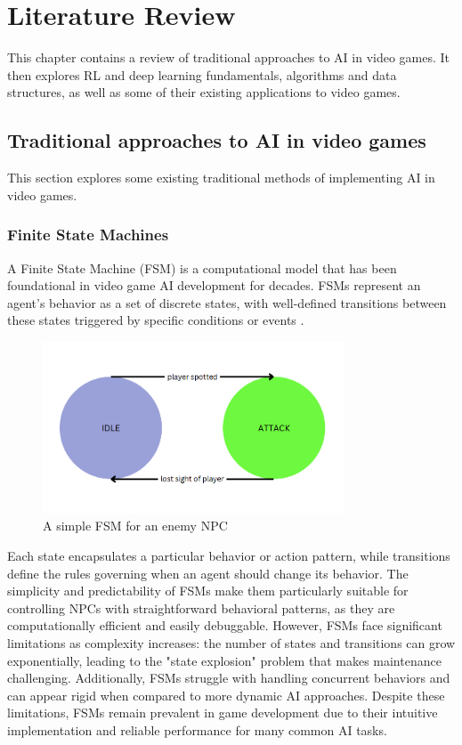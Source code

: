 \chapter{Literature Review}

This chapter contains a review of traditional approaches to AI in video games.
It then explores RL and deep learning fundamentals, algorithms and data structures, as well as some of their existing applications to video games.

\section{Traditional approaches to AI in video games}

This section explores some existing traditional methods of implementing AI in video games.

\subsection{Finite State Machines}

A Finite State Machine (FSM) is a computational model that has been foundational in video game AI development for decades. 
FSMs represent an agent's behavior as a set of discrete states, with well-defined transitions between these states triggered by specific conditions or events \cite{spiceworks_fsm}. 

\begin{figure}[H]
    \centering
    \includegraphics[width=0.8\textwidth]{figures/fsm_example.png}
    \caption{A simple FSM for an enemy NPC}
    \label{fig:fsm}
\end{figure}

Each state encapsulates a particular behavior or action pattern, while transitions define the rules governing when an agent should change its behavior. 
The simplicity and predictability of FSMs make them particularly suitable for controlling NPCs with straightforward behavioral patterns, as they are computationally efficient and easily debuggable.
However, FSMs face significant limitations as complexity increases: the number of states and transitions can grow exponentially, leading to the "state explosion" problem that makes maintenance challenging.
Additionally, FSMs struggle with handling concurrent behaviors and can appear rigid when compared to more dynamic AI approaches. 
Despite these limitations, FSMs remain prevalent in game development due to their intuitive implementation and reliable performance for many common AI tasks.

